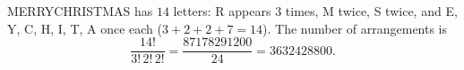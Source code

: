 MERRYCHRISTMAS has $14$ letters: R appears $3$ times, M twice, S twice, and E, Y, C, H, I, T, A once each ($3+2+2+7=14$). The number of arrangements is
\[
\dfrac{14!}{3!\,2!\,2!}=\dfrac{87178291200}{24}=\boxed{3632428800}.
\]
